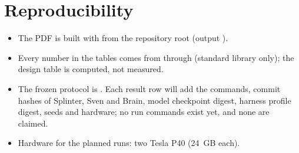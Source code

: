 
\section{Reproducibility}

\begin{itemize}
\item The PDF is built with  from the
repository root (output ).
\item Every number in the tables comes from  through
 (standard library only); the design table is computed, not
measured.
\item The frozen protocol is . Each result row will add the
commands, commit hashes of Splinter, Sven and Brain, model checkpoint digest, harness
profile digest, seeds and hardware; no run commands exist yet, and none are claimed.
\item Hardware for the planned runs: two Tesla P40 (24~GB each).
\end{itemize}
